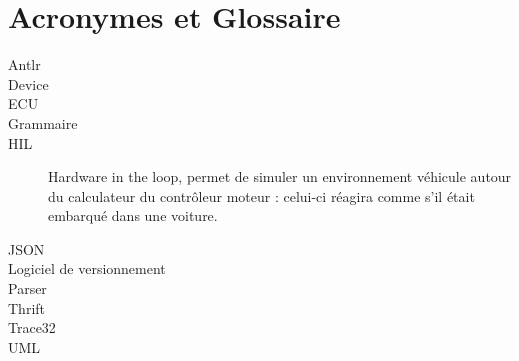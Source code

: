 \chapter{Acronymes et Glossaire}
\begin{description}
\item[Antlr]
\item[Device]
\item[ECU]
\item[Grammaire]
\item[HIL] Hardware in the loop, permet de simuler un environnement véhicule autour du calculateur du contrôleur moteur : celui-ci réagira comme s'il était embarqué dans une voiture.
\item[JSON]
\item[Logiciel de versionnement]
\item[Parser]
\item[Thrift]
\item[Trace32]
\item[UML]
\end{description}

